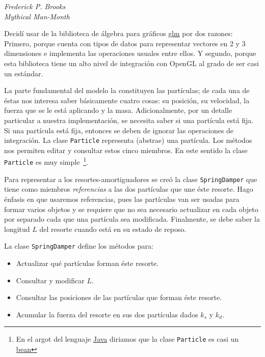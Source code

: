 \epigraph{}{\textit{Frederick P. Brooks \\ Mythical Man-Month}}

Decidí usar de la biblioteca de álgebra para gráficos \href{http://github.com/g-truc/glm}{glm} por dos razones:
Primero, porque cuenta con tipos de datos para representar vectores en 2 y 3 dimensiones e implementa las operaciones usuales entre ellos.
Y segundo, porque esta biblioteca tiene un alto nivel de integración con OpenGL al grado de ser casi un estándar.

La parte fundamental del modelo la constituyen las partículas; de cada una de éstas nos interesa saber básicamente cuatro cosas: su posición, su velocidad, la fuerza que se le está aplicando y la masa.
Adicionalmente, por un detalle particular a nuestra implementación, se necesita saber si una partícula está fija.
Si una partícula está fija, entonces se deben de ignorar las operaciones de integración.
La clase \texttt{Particle} representa (abstrae) una partícula. Los métodos nos permiten editar y consultar estos cinco miembros.
En este sentido la clase \texttt{Particle} es muy simple~\footnote{En el argot del lenguaje \href{http://www.java.com/en/}{Java} diriamos que la clase \texttt{Particle} es casi un \href{http://en.wikipedia.org/wiki/JavaBeans}{bean}}.

Para representar a los resortes-amortiguadores se creó la clase \texttt{SpringDamper} que tiene como miembros \emph{referencias} a las dos partículas que une éste resorte.
Hago énfasis en que usaremos referencias, pues las partículas van ser usadas para formar varios objetos y se requiere que no sea necesario actualizar en cada objeto por separado cada que una partícula sea modificada. Finalmente, se debe saber la longitud $L$ del resorte cuando está en su estado de reposo.

La clase \texttt{SpringDamper} define los métodos para:
\begin{itemize}
 \item Actualizar qué partículas forman éste resorte.
 \item Consultar y modificar $L$.
 \item Consultar las posiciones de las partículas que forman éste resorte.
 \item Acumular la fuerza del resorte en sus dos partículas dados $k_s$ y $k_d$.
\end{itemize}

